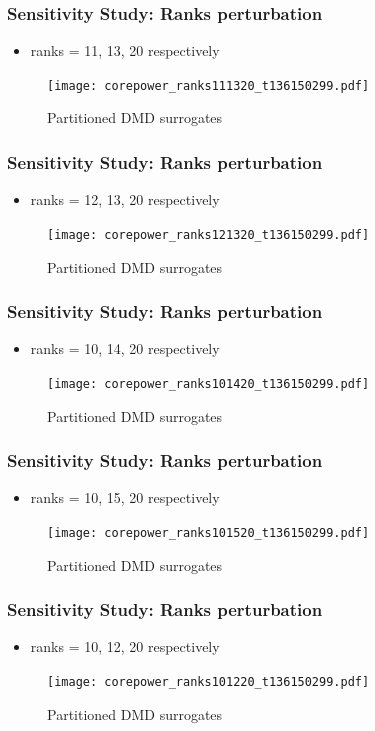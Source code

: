\documentclass[fleqn]{beamer}
\begin{document}
\begin{frame}
\frametitle{Sensitivity Study: Ranks perturbation}
\begin{itemize}
 \item ranks = 11, 13, 20 respectively
\end{itemize}
\begin{figure}[ht]
\texttt{[image: corepower\_ranks111320\_t136150299.pdf]}
\caption{Partitioned DMD surrogates}
\end{figure}
\end{frame}

\begin{frame}
\frametitle{Sensitivity Study: Ranks perturbation}
\begin{itemize}
 \item ranks = 12, 13, 20 respectively
\end{itemize}

\begin{figure}[ht]

\texttt{[image: corepower\_ranks121320\_t136150299.pdf]}
\caption{Partitioned DMD surrogates}
\end{figure}
\end{frame}

\begin{frame}
\frametitle{Sensitivity Study: Ranks perturbation}
\begin{itemize}
 \item ranks = 10, 14, 20 respectively
\end{itemize}
\begin{figure}[ht]
\texttt{[image: corepower\_ranks101420\_t136150299.pdf]}
\caption{Partitioned DMD surrogates}
\end{figure}
\end{frame}

\begin{frame}
\frametitle{Sensitivity Study: Ranks perturbation}
\begin{itemize}
 \item ranks = 10, 15, 20 respectively
\end{itemize}
\begin{figure}[ht]
\texttt{[image: corepower\_ranks101520\_t136150299.pdf]}
\caption{Partitioned DMD surrogates}
\end{figure}
\end{frame}

\begin{frame}
\frametitle{Sensitivity Study: Ranks perturbation}
\begin{itemize}
 \item ranks = 10, 12, 20 respectively
\end{itemize}
\begin{figure}[ht]
\texttt{[image: corepower\_ranks101220\_t136150299.pdf]}
\caption{Partitioned DMD surrogates}
\end{figure}
\end{frame}
\end{document}
